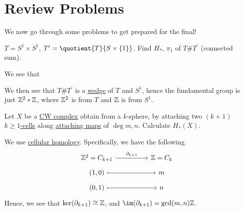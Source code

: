 \section{Review Problems}
We now go through some problems to get prepared for the final!
\begin{exercise}[QR May 2019]
	\(T = S^1 \times S^1\), \(T^\prime = \quotient{T}{S \times \{1\}} \). Find \(H_\ast\), \(\pi _1\) of \(T \# T^\prime \) (connected sum).
\end{exercise}
\begin{answer}
	We see that
	\begin{figure}[H]
		\centering
		\label{fig:ans:ex-1:lec-40}
	\end{figure}
	We then see that \(T\# T^\prime \) is a \hyperref[CW-complex-wedge-sum]{wedge} of \(T\) and \(S^1\), hence the fundamental group is just
	\(\mathbb{\MakeUppercase{z}} ^{2} \ast \mathbb{\MakeUppercase{z}} \), where \(\mathbb{\MakeUppercase{z}} ^{2} \) is from \(T\) and \(\mathbb{\MakeUppercase{z}} \)
	is from \(S^{1} \).
\end{answer}

\begin{exercise}[QR Aug. 2019]
	Let \(X\) be a \hyperref[def:CW-Complex]{CW complex} obtain from a \(k\)-sphere, by attaching two \((k+1)\) \hyperref[def:cell]{\(k\geq 1\)-cells}
	along \hyperref[def:attaching-map]{attaching maps} of \(\deg m, n\). Calculate \(H_\ast (X)\).
\end{exercise}
\begin{answer}
	We use \hyperref[def:cellular-homology-group]{cellular homology}. Specifically, we have the following.
	\[\begin{tikzcd}[row sep=tiny]
			{\mathbb{Z}^2=C_{k+1}} && {\mathbb{Z}=C_k} \\
			{(1, 0)} && m \\
			{(0, 1)} && n
			\arrow[maps to, from=2-1, to=2-3]
			\arrow[maps to, from=3-1, to=3-3]
			\arrow["{\partial_{k+1}}", from=1-1, to=1-3]
		\end{tikzcd}\]
	Hence, we see that \(\ker(\partial _{k+1}) \cong \mathbb{\MakeUppercase{z}} \), and \(\im(\partial _{k+1}) = \gcd(m, n)\mathbb{\MakeUppercase{z}} \).
\end{answer}

